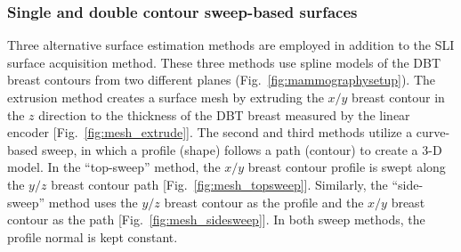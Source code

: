\subsubsection{Single and double contour sweep-based surfaces}
Three alternative surface estimation methods are employed in addition to the SLI surface acquisition method. These three methods use spline models of the DBT breast contours from two different planes (Fig.~\ref{fig:mammographysetup}). The extrusion method creates a surface mesh by extruding the $x/y$ breast contour in the $z$ direction to the thickness of the DBT breast measured by the linear encoder [Fig.~\ref{fig:mesh_extrude}]. The second and third methods utilize a curve-based sweep, in which a profile (shape) follows a path (contour) to create a 3-D model. In the ``top-sweep'' method, the $x/y$ breast contour profile is swept along the $y/z$ breast contour path [Fig.~\ref{fig:mesh_topsweep}]. Similarly, the ``side-sweep'' method uses the $y/z$ breast contour as the profile and the $x/y$ breast contour as the path [Fig.~\ref{fig:mesh_sidesweep}]. In both sweep methods, the profile normal is kept constant.


